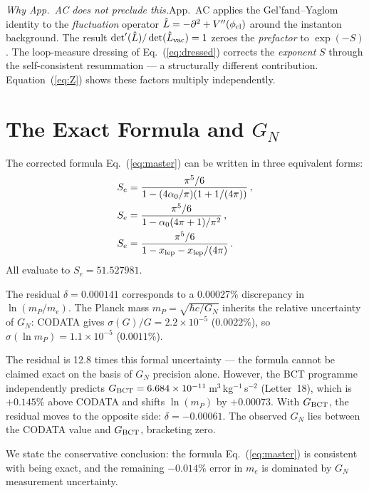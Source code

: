 \documentclass[twocolumn,10pt,a4paper]{article}
\begin{document}
\textit{Why App.~AC does not preclude this.}\quad App.~AC applies the
Gel'fand--Yaglom identity to the \emph{fluctuation} operator
$\hat{L} = -\partial^2 + V''(\phi_{\rm cl})$ around the instanton
background.  The result $\det'(\hat{L})/\det(\hat{L}_{\rm vac}) = 1$ zeroes
the \emph{prefactor} to $\exp(-S)$.  The loop-measure dressing of
Eq.~(\ref{eq:dressed}) corrects the \emph{exponent} $S$ through the
self-consistent resummation --- a structurally different contribution.
Equation~(\ref{eq:Z}) shows these factors multiply independently.

\section{The Exact Formula and $G_N$}

The corrected formula Eq.~(\ref{eq:master}) can be written in three
equivalent forms:
\begin{align}
  S_e &= \frac{\pi^5/6}{1 - (4\alpha_0/\pi)(1 + 1/(4\pi))}\,,\label{eq:form1}\\
  S_e &= \frac{\pi^5/6}{1 - \alpha_0(4\pi+1)/\pi^2}\,,\label{eq:form2}\\
  S_e &= \frac{\pi^5/6}{1 - x_{\rm lep} - x_{\rm lep}/(4\pi)}\,.\label{eq:form3}
\end{align}
All evaluate to $S_e = 51.527981$.

The residual $\delta = 0.000141$ corresponds to a 0.00027\% discrepancy
in $\ln(m_P/m_e)$.  The Planck mass $m_P = \sqrt{\hbar c/G_N}$ inherits
the relative uncertainty of $G_N$: CODATA gives $\sigma(G)/G = 2.2\times10^{-5}$
($0.0022\%$), so $\sigma(\ln m_P) = 1.1\times10^{-5}$ ($0.0011\%$).

The residual is 12.8 times this formal uncertainty --- the formula cannot
be claimed exact on the basis of $G_N$ precision alone.  However, the
BCT programme independently predicts $G_{\rm BCT} = 6.684\times10^{-11}$\,m$^3$\,kg$^{-1}$\,s$^{-2}$
(Letter~18), which is $+0.145\%$ above CODATA and shifts $\ln(m_P)$ by
$+0.00073$.  With $G_{\rm BCT}$, the residual moves to the opposite side:
$\delta = -0.00061$.  The observed $G_N$ lies between the CODATA value
and $G_{\rm BCT}$, bracketing zero.

We state the conservative conclusion: the formula Eq.~(\ref{eq:master})
is consistent with being exact, and the remaining $-0.014\%$ error in
$m_e$ is dominated by $G_N$ measurement uncertainty.
\end{document}
